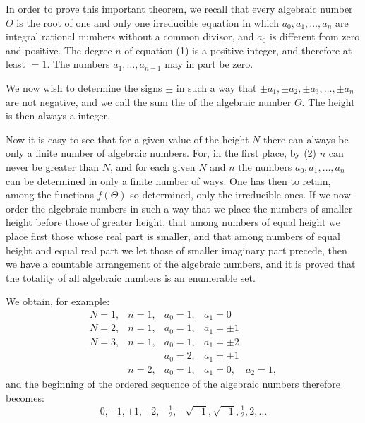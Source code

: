 In order to prove this important theorem, we recall that every algebraic number $\Theta$ is the root of one and only one irreducible equation
in which $a_0, a_1, \ldots, a_n$ are integral rational numbers without a common divisor, and $a_0$ is different from zero and positive. The degree $n$ of equation (1) is a positive integer, and therefore at least $=1$. The numbers $a_1, \ldots, a_{n-1}$ may in part be zero.

We now wish to determine the signs $\pm$ in such a way that $\pm a_1, \pm a_2, \pm a_3, \ldots, \pm a_n$ are not negative, and we call the sum
the  of the algebraic number $\Theta$. The height is then always a  integer.

Now it is easy to see that for a given value of the height $N$ there can always be only a finite number of algebraic numbers. For, in the first place, by (2) $n$ can never be greater than $N$, and for each given $N$ and $n$ the numbers $a_0, a_1, \ldots, a_n$ can be determined in only a finite number of ways. One has then to retain, among the functions $f(\Theta)$ so determined, only the irreducible ones. If we now order the algebraic numbers in such a way that we place the numbers of smaller height before those of greater height, that among numbers of equal height we place first those whose real part is smaller, and that among numbers of equal height and equal real part we let those of smaller imaginary part precede, then we have a countable arrangement of the algebraic numbers, and it is proved that the totality of all algebraic numbers is an enumerable set.

We obtain, for example:
\[
\begin{array}{llll}
N=1, & n=1, & a_0=1, & a_1=0\\
N=2, & n=1, & a_0=1, & a_1=\pm 1\\
N=3, & n=1, & a_0=1, & a_1=\pm 2\\
     &      & a_0=2, & a_1=\pm 1\\
     & n=2, & a_0=1, & a_1=0, \quad a_2=1,
\end{array}
\]
and the beginning of the ordered sequence of the algebraic numbers therefore becomes:
\[
0, -1, +1, -2, -\tfrac{1}{2}, -\sqrt{-1}, \sqrt{-1}, \tfrac{1}{2}, 2, \ldots
\]
